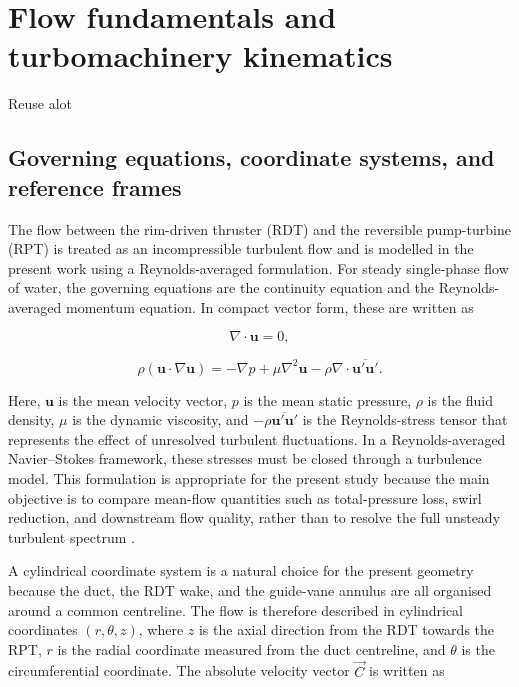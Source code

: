 \section{Flow fundamentals and turbomachinery kinematics}
Reuse alot




\subsection{Governing equations, coordinate systems, and reference frames}
\label{sec:theory_kinematics}

The flow between the rim-driven thruster (RDT) and the reversible pump-turbine (RPT) is treated as an incompressible turbulent flow and is modelled in the present work using a Reynolds-averaged formulation. For steady single-phase flow of water, the governing equations are the continuity equation and the Reynolds-averaged momentum equation. In compact vector form, these are written as

\begin{equation}
\nabla \cdot \mathbf{u} = 0,
\end{equation}

\begin{equation}
\rho \left( \mathbf{u} \cdot \nabla \mathbf{u} \right)
=
-\nabla p
+ \mu \nabla^2 \mathbf{u}
- \rho \nabla \cdot \overline{\mathbf{u}'\mathbf{u}'}.
\end{equation}

Here, \(\mathbf{u}\) is the mean velocity vector, \(p\) is the mean static pressure, \(\rho\) is the fluid density, \(\mu\) is the dynamic viscosity, and \(-\rho \overline{\mathbf{u}'\mathbf{u}'}\) is the Reynolds-stress tensor that represents the effect of unresolved turbulent fluctuations. In a Reynolds-averaged Navier--Stokes framework, these stresses must be closed through a turbulence model. This formulation is appropriate for the present study because the main objective is to compare mean-flow quantities such as total-pressure loss, swirl reduction, and downstream flow quality, rather than to resolve the full unsteady turbulent spectrum \cite{Pope2000}.

A cylindrical coordinate system is a natural choice for the present geometry because the duct, the RDT wake, and the guide-vane annulus are all organised around a common centreline. The flow is therefore described in cylindrical coordinates \((r,\theta,z)\), where \(z\) is the axial direction from the RDT towards the RPT, \(r\) is the radial coordinate measured from the duct centreline, and \(\theta\) is the circumferential coordinate. The absolute velocity vector \(\vec{C}\) is written as


